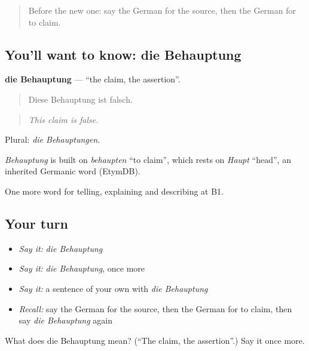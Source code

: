 \begin{quote}
Before the new one: say the German for the source, then the German for to claim.
\end{quote}

\subsection*{You'll want to know: die Behauptung}
\textbf{die Behauptung} — \textquotedblleft{}the claim, the assertion\textquotedblright{}.

\begin{quote}
Diese Behauptung ist falsch.
\end{quote}

\begin{quote}
\emph{This claim is false.}
\end{quote}

Plural: \emph{die Behauptungen}.

\begin{cousinweb}
\emph{Behauptung} is built on \emph{behaupten} \textquotedblleft{}to claim\textquotedblright{}, which rests on \emph{Haupt} \textquotedblleft{}head\textquotedblright{}, an inherited Germanic word (EtymDB).
\end{cousinweb}

\begin{grammarlens}[title={What you've built}]
One more word for telling, explaining and describing at B1.
\end{grammarlens}

\subsection*{Your turn}
\begin{itemize}
\raggedright
  \item \emph{Say it:} \emph{die Behauptung}
  \item \emph{Say it:} \emph{die Behauptung}, once more
  \item \emph{Say it:} a sentence of your own with \emph{die Behauptung}
  \item \emph{Recall:} say the German for the source, then the German for to claim, then say \emph{die Behauptung} again
\end{itemize}

\begin{tcolorbox}[breakable,colback=teal!4,colframe=teal!35!black,title={Before you move on}]
What does die Behauptung mean? (\textquotedblleft{}The claim, the assertion\textquotedblright{}.) Say it once more.
\end{tcolorbox}
